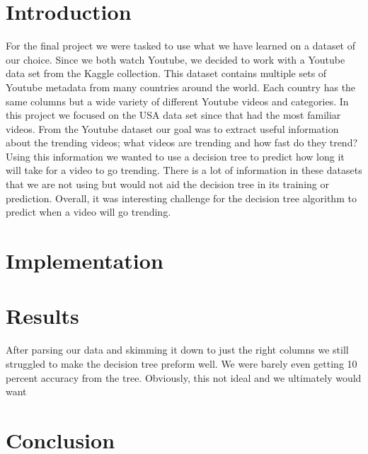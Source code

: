 \documentclass{article}
\begin{document}
\section*{Introduction}
For the final project we were tasked to use what we have learned on a dataset of our choice. 
Since we both watch Youtube, we decided to work with a Youtube data set from the Kaggle collection. 
This dataset contains multiple sets of Youtube metadata from many countries around the world. 
Each country has the same columns but a wide variety of different Youtube videos and categories. 
In this project we focused on the USA data set since that had the most familiar videos. 
From the Youtube dataset our goal was to extract useful information about the trending videos; what videos are trending and how fast do they trend?
Using this information we wanted to use a decision tree to predict how long it will take for a video to go trending. 
There is a lot of information in these datasets that we are not using but would not aid the decision tree in its training or prediction.
Overall, it was interesting challenge for the decision tree algorithm to predict when a video will go trending.
\section*{Implementation}
\section*{Results}
\par
    After parsing our data and skimming it down to just the right columns we still struggled to make the decision tree preform well.
We were barely even getting 10 percent accuracy from the tree.
Obviously, this not ideal and we ultimately would want 

\section*{Conclusion}
\end{document}

